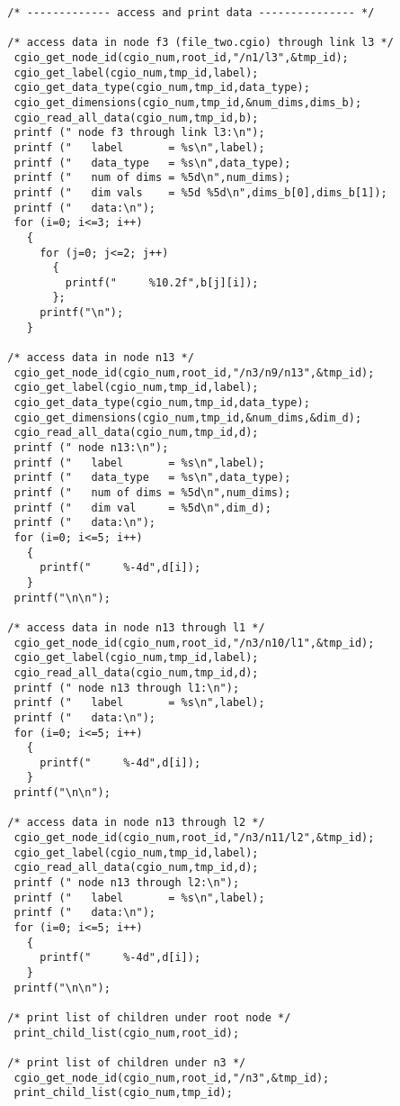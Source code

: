 \begin{verbatim}
  /* ------------- access and print data --------------- */

  /* access data in node f3 (file_two.cgio) through link l3 */
   cgio_get_node_id(cgio_num,root_id,"/n1/l3",&tmp_id);
   cgio_get_label(cgio_num,tmp_id,label);
   cgio_get_data_type(cgio_num,tmp_id,data_type);
   cgio_get_dimensions(cgio_num,tmp_id,&num_dims,dims_b);
   cgio_read_all_data(cgio_num,tmp_id,b);
   printf (" node f3 through link l3:\n");
   printf ("   label       = %s\n",label);
   printf ("   data_type   = %s\n",data_type);
   printf ("   num of dims = %5d\n",num_dims);
   printf ("   dim vals    = %5d %5d\n",dims_b[0],dims_b[1]);
   printf ("   data:\n");
   for (i=0; i<=3; i++)
     {
       for (j=0; j<=2; j++)
         {
           printf("     %10.2f",b[j][i]);
         };
       printf("\n");
     }

  /* access data in node n13 */
   cgio_get_node_id(cgio_num,root_id,"/n3/n9/n13",&tmp_id);
   cgio_get_label(cgio_num,tmp_id,label);
   cgio_get_data_type(cgio_num,tmp_id,data_type);
   cgio_get_dimensions(cgio_num,tmp_id,&num_dims,&dim_d);
   cgio_read_all_data(cgio_num,tmp_id,d);
   printf (" node n13:\n");
   printf ("   label       = %s\n",label);
   printf ("   data_type   = %s\n",data_type);
   printf ("   num of dims = %5d\n",num_dims);
   printf ("   dim val     = %5d\n",dim_d);
   printf ("   data:\n");
   for (i=0; i<=5; i++)
     {
       printf("     %-4d",d[i]);
     }
   printf("\n\n");

  /* access data in node n13 through l1 */
   cgio_get_node_id(cgio_num,root_id,"/n3/n10/l1",&tmp_id);
   cgio_get_label(cgio_num,tmp_id,label);
   cgio_read_all_data(cgio_num,tmp_id,d);
   printf (" node n13 through l1:\n");
   printf ("   label       = %s\n",label);
   printf ("   data:\n");
   for (i=0; i<=5; i++)
     {
       printf("     %-4d",d[i]);
     }
   printf("\n\n");

  /* access data in node n13 through l2 */
   cgio_get_node_id(cgio_num,root_id,"/n3/n11/l2",&tmp_id);
   cgio_get_label(cgio_num,tmp_id,label);
   cgio_read_all_data(cgio_num,tmp_id,d);
   printf (" node n13 through l2:\n");
   printf ("   label       = %s\n",label);
   printf ("   data:\n");
   for (i=0; i<=5; i++)
     {
       printf("     %-4d",d[i]);
     }
   printf("\n\n");

  /* print list of children under root node */
   print_child_list(cgio_num,root_id);

  /* print list of children under n3 */
   cgio_get_node_id(cgio_num,root_id,"/n3",&tmp_id);
   print_child_list(cgio_num,tmp_id);


\end{verbatim}
